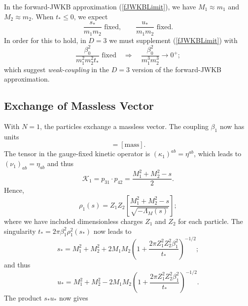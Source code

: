 In the forward-JWKB approximation (\ref{fJWKBLimit}), we have $M_{1} \approx m_{1}$ and $M_{2} \approx m_{2}$. When $t_{*} \leq 0$, we expect
\begin{equation}
	\frac{s_{*}}{m_{1} m_{2}} \text{ fixed}, \qquad \frac{u_{*}}{m_{1} m_{2}} \text{ fixed.}
\end{equation}
In order for this to hold, in $D = 3$ we must supplement (\ref{fJWKBLimit}) with
\begin{equation}
	\frac{\beta_{0}^{2}}{m_{1}^{2} m_{2}^{2} t_{*}} \text{ fixed} \quad \Longrightarrow \quad \frac{\beta_{0}^{2}}{m_{1}^{3} m_{2}^{3}} \rightarrow 0^{+};
\end{equation}
which suggest \textit{weak-coupling} in the $D = 3$ version of the forward-JWKB approximation.
\subsection{Exchange of Massless Vector}
With $N = 1$, the particles exchange a massless vector. The coupling $\beta_{1}$ now has units
\begin{equation}
	[\beta_{1}] = [\text{mass}].
\end{equation}
The tensor in the gauge-fixed kinetic operator is $(\kappa_{1})^{ab} = \eta^{ab}$, which leads to $(\nu_{1})_{ab} = \eta_{ab}$ and thus
\begin{equation}
	\mathcal{K}_{1} = p_{31} \cdot p_{42} = \frac{M_{1}^{2} + M_{2}^{2} - s}{2}.
\end{equation}
Hence,
\begin{equation}
	\rho_{1}(s) = Z_{1} Z_{2} \left[ \frac{M_{1}^{2} + M_{2}^{2} - s}{\sqrt{-\Lambda_{M}(s)}} \right];
\end{equation}
where we have included dimensionless charges $Z_{1}$ and $Z_{2}$ for each particle. The singularity $t_{*} = 2 \pi \beta_{1}^{2} \rho_{1}^{2}(s_{*})$ now leads to
\begin{equation}
	s_{*} = M_{1}^{2} + M_{2}^{2} + 2 M_{1} M_{2} \left(1 + \frac{2 \pi Z_{1}^{2} Z_{2}^{2} \beta_{1}^{2}}{t_{*}} \right)^{-1/2};
\end{equation}
and thus
\begin{equation}
	u_{*} = M_{1}^{2} + M_{2}^{2} - 2 M_{1} M_{2} \left(1 + \frac{2 \pi Z_{1}^{2} Z_{2}^{2} \beta_{1}^{2}}{t_{*}} \right)^{-1/2}.
\end{equation}
The product $s_{*} u_{*}$ now gives
